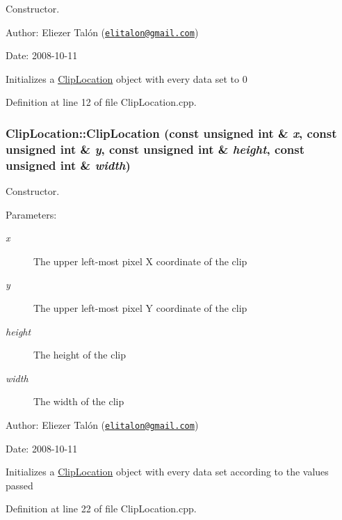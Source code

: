Constructor. 

\begin{Desc}
\item[Author:]Eliezer Talón (\href{mailto:elitalon@gmail.com}{\tt elitalon@gmail.com}) \end{Desc}
\begin{Desc}
\item[Date:]2008-10-11\end{Desc}
Initializes a \hyperlink{class_clip_location}{ClipLocation} object with every data set to 0 

Definition at line 12 of file ClipLocation.cpp.\hypertarget{class_clip_location_df3b25b12a4ce75a657ae79f241c61c2}{
\subsubsection[ClipLocation]{\setlength{\rightskip}{0pt plus 5cm}ClipLocation::ClipLocation (const unsigned int \& {\em x}, \/  const unsigned int \& {\em y}, \/  const unsigned int \& {\em height}, \/  const unsigned int \& {\em width})}}
\label{class_clip_location_df3b25b12a4ce75a657ae79f241c61c2}


Constructor. 

\begin{Desc}
\item[Parameters:]
\begin{description}
\item[{\em x}]The upper left-most pixel X coordinate of the clip \item[{\em y}]The upper left-most pixel Y coordinate of the clip \item[{\em height}]The height of the clip \item[{\em width}]The width of the clip\end{description}
\end{Desc}
\begin{Desc}
\item[Author:]Eliezer Talón (\href{mailto:elitalon@gmail.com}{\tt elitalon@gmail.com}) \end{Desc}
\begin{Desc}
\item[Date:]2008-10-11\end{Desc}
Initializes a \hyperlink{class_clip_location}{ClipLocation} object with every data set according to the values passed 

Definition at line 22 of file ClipLocation.cpp.

